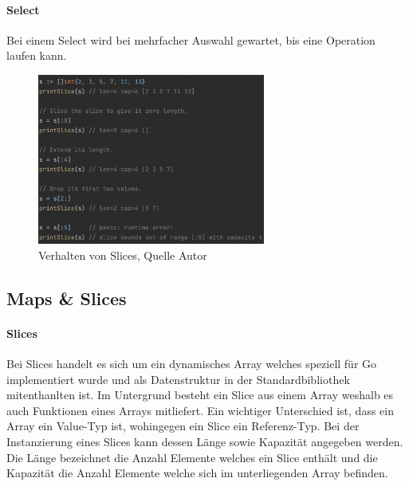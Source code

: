 \documentclass[12pt,titlepage]{article}
\begin{document}
\paragraph{Select}
Bei einem Select wird bei mehrfacher Auswahl gewartet, bis eine Operation laufen kann. 

\begin{figure}
	\centering
	\includegraphics[width=7.5cm]{slices}
	\caption{Verhalten von Slices, Quelle Autor}\label{slices}
\end{figure}
\subsection{Maps \& Slices}
\paragraph{Slices}
Bei Slices handelt es sich um ein dynamisches Array welches speziell für Go implementiert wurde und als Datenstruktur in der Standardbibliothek mitenthanlten ist.
Im Untergrund besteht ein Slice aus einem Array weshalb es auch Funktionen eines Arrays mitliefert.
Ein wichtiger Unterschied ist, dass ein Array ein Value-Typ ist, wohingegen ein Slice ein Referenz-Typ.
Bei der Instanzierung eines Slices kann dessen Länge sowie Kapazität angegeben werden.
Die Länge bezeichnet die Anzahl Elemente welches ein Slice enthält und die Kapazität die Anzahl Elemente welche sich im unterliegenden Array befinden.
\end{document}
